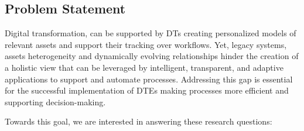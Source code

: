 \subsection*{Problem Statement}
Digital transformation, can be supported by \aclp{DT} creating personalized models of relevant assets and support their tracking over workflows.
Yet, legacy systems, assets heterogeneity and dynamically evolving relationships hinder the creation of a holistic view that can be leveraged by intelligent, transparent, and adaptive applications to support and automate processes.
Addressing this gap is essential for the successful implementation of \aclp{DTE} making processes more efficient and supporting decision-making.

Towards this goal, we are interested in answering these research questions:

